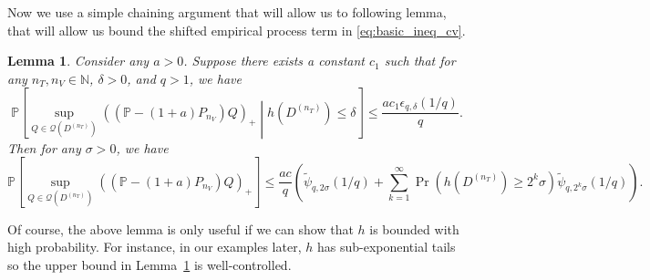 \documentclass[10pt]{book}
\newtheorem{lemma}{Lemma}
\theoremstyle{definition}
\begin{document}
Now we use a simple chaining argument that will allow us to following lemma, that will allow us bound the shifted empirical process term in \eqref{eq:basic_ineq_cv}.
\begin{lemma}
	\label{lemma:chain}
Consider any $a>0$.
Suppose there exists a constant $c_{1}$ such that for any $n_{T},n_{V} \in \mathbb{N}$, $\delta>0$,
and $q>1$, we have
\[
\mathbb{P}\left[
\sup_{Q\in\mathcal{Q}(D^{(n_{T})})}\left(\left(\mathbb{P}-(1+a)P_{n_{V}}\right)Q\right)_{+}
\middle | 
h\left(D^{(n_{T})}\right)\le\delta\right]
\le\frac{ac_{1}\epsilon_{q,\delta}(1/q)}{q}.
\]
Then for any $\sigma > 0$, we have
\[
\mathbb{P}\left[\sup_{Q\in\mathcal{Q}(D^{(n_{T})})}\left(\left(\mathbb{P}-(1+a)P_{n_{V}}\right)Q\right)_{+}\right]
\le
\frac{ac}{q}
\left(
\tilde{\psi}_{q,2\sigma}(1/q)
+\sum_{k=1}^{\infty}\Pr\left(h\left(D^{(n_{T})}\right)\ge2^{k}\sigma\right)
\tilde{\psi}_{q,2^{k}\sigma}(1/q)
\right)
.
\]
\end{lemma}
Of course, the above lemma is only useful if we can show that $h$ is bounded with high probability.
For instance, in our examples later, $h$ has sub-exponential tails so the upper bound in Lemma~\ref{lemma:chain} is well-controlled.
\end{document}
